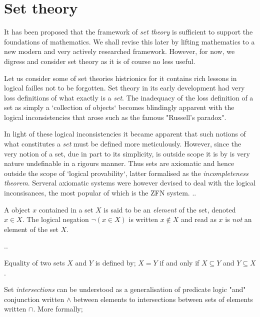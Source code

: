 %
%

\section{Set theory} %
\label{sec:settheory}

It has been proposed that the framework of \emph{set theory} is sufficient to
support the foundations of mathematics. We shall revise this later by lifting
mathematics to a new modern and very actively researched framework. However,
for now, we digress and consider set theory as it is of course no less useful.

Let us consider some of set theories histrionics for it contains rich lessons
in logical failles not to be forgotten. Set theory in its early development had
very loss definitions of what exactly is a \emph{set}. The inadequacy of the
loss definition of a set as simply a `collection of objects` becomes blindingly
apparent with the logical inconsistencies that arose such as the famous
"Russell's paradox".

In light of these logical inconsistencies it became apparent that such notions
of what constitutes a \emph{set} must be defined more meticulously. However,
since the very notion of a set, due in part to its simplicity, is outside scope
it is by is very nature undefinable in a rigours manner. Thus sets are
axiomatic and hence outside the scope of `logical provability`, latter
formalised as the \emph{incompleteness theorem}. Serveral axiomatic systems
were however devised to deal with the logical inconsisances, the most popular
of which is the ZFN system.
..

\begin{defn}
 A object $x$ contained in a set $X$ is said to be an \emph{element} of the
 set, denoted $x \in X$. The logical negation $\neg (x \in X)$ is written
 $x \not \in X$ and read as $x$ is \emph{not} an element of the set $X$.
\end{defn}

..

\begin{defn}
 Equality of two sets $X$ and $Y$ is defined by; $X=Y$ if and only if
 $X \subseteq Y$ and $Y \subseteq X$.
\end{defn}

Set \emph{intersections} can be understood as a generalisation of predicate
logic "and" conjunction written $\wedge$ between elements to intersections
between sets of elements written $\cap$. More formally;

